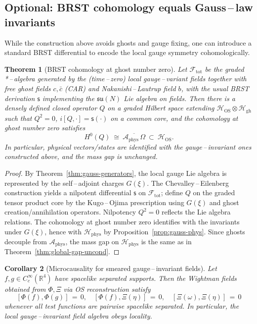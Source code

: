 \documentclass[11pt]{amsart}
\theoremstyle{plain}
\newtheorem{theorem}{Theorem}[section]
\newtheorem{corollary}[theorem]{Corollary}
\theoremstyle{definition}
\theoremstyle{remark}
\begin{document}
\subsection{Optional: BRST cohomology equals Gauss\,–\,law invariants}

While the construction above avoids ghosts and gauge fixing, one can introduce a standard BRST differential to encode the local gauge symmetry cohomologically.

\begin{theorem}[BRST cohomology at ghost number zero]\label{thm:brst}
Let $\mathcal F_{\mathrm{tot}}$ be the graded *\,–\,algebra generated by the (time\,–\,zero) local gauge\,–\,variant fields together with free ghost fields $c,\bar c$ (CAR) and Nakanishi\,–\,Lautrup field $b$, with the usual BRST derivation $\mathsf s$ implementing the $\mathfrak{su}(N)$ Lie algebra on fields. Then there is a densely defined closed operator $Q$ on a graded Hilbert space extending $\mathcal H_{\mathrm{OS}}\otimes \mathcal H_{\mathrm{gh}}$ such that $Q^2=0$, $i[Q,\cdot]=\mathsf s(\cdot)$ on a common core, and the cohomology at ghost number zero satisfies
\[
  H^0(Q)\ \cong\ \overline{\mathcal A_{\mathrm{phys}}\,\Omega}\ \subset\ \mathcal H_{\mathrm{OS}}.
\]
In particular, physical vectors/states are identified with the gauge\,–\,invariant ones constructed above, and the mass gap is unchanged.
\end{theorem}
\begin{proof}
By Theorem~\ref{thm:gauss-generators}, the local gauge Lie algebra is represented by the self\,--\,adjoint charges $G(\xi)$. The Chevalley\,--\,Eilenberg construction yields a nilpotent differential $\mathsf s$ on $\mathcal F_{\mathrm{tot}}$; define $Q$ on the graded tensor product core by the Kugo\,--\,Ojima prescription using $G(\xi)$ and ghost creation/annihilation operators. Nilpotency $Q^2=0$ reflects the Lie algebra relations. The cohomology at ghost number zero identifies with the invariants under $G(\xi)$, hence with $\mathcal H_{\mathrm{phys}}$ by Proposition~\ref{prop:gauss-phys}. Since ghosts decouple from $\mathcal A_{\mathrm{phys}}$, the mass gap on $\mathcal H_{\mathrm{phys}}$ is the same as in Theorem~\ref{thm:global-gap-uncond}.
\end{proof}

\begin{corollary}[Microcausality for smeared gauge\,--\,invariant fields]
\label{cor:microcausality}
Let $f,g\in C_c^\infty(\mathbb R^4)$ have spacelike separated supports. Then the Wightman fields obtained from $\Phi,\Xi$ via OS reconstruction satisfy
\[
  [\Phi(f),\Phi(g)]\,=\,0,\quad [\Phi(f),\Xi(\eta)]\,=\,0,\quad [\Xi(\omega),\Xi(\eta)]\,=\,0
\]
whenever all test functions are pairwise spacelike separated. In particular, the local gauge\,--\,invariant field algebra obeys locality.
\end{corollary}
\end{document}
